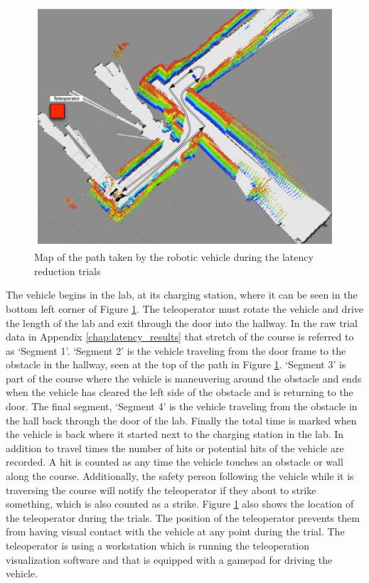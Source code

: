 \documentclass[12pt]{report}
\begin{document}
\begin{figure}[ht]
  \centering
  \includegraphics[width=6.5in,keepaspectratio]{latency_reduction_map.pdf}
  \caption{Map of the path taken by the robotic vehicle during the latency reduction trials}
  \label{fig:latency_reduction_map}
\end{figure}

The vehicle begins in the lab, at its charging station, where it can be seen in the bottom left corner of Figure \ref{fig:latency_reduction_map}.  The teleoperator must rotate the vehicle and drive the length of the lab and exit through the door into the hallway.  In the raw trial data in Appendix \ref{chap:latency_results} that stretch of the course is referred to as `Segment 1'.  `Segment 2' is the vehicle traveling from the door frame to the obstacle in the hallway, seen at the top of the path in Figure \ref{fig:latency_reduction_map}.  `Segment 3' is part of the course where the vehicle is maneuvering around the obstacle and ends when the vehicle has cleared the left side of the obstacle and is returning to the door.  The final segment, `Segment 4' is the vehicle traveling from the obstacle in the hall back through the door of the lab.  Finally the total time is marked when the vehicle is back where it started next to the charging station in the lab.  In addition to travel times the number of hits or potential hits of the vehicle are recorded.  A hit is counted as any time the vehicle touches an obstacle or wall along the course.  Additionally, the safety person following the vehicle while it is traversing the course will notify the teleoperator if they about to strike something, which is also counted as a strike.  Figure \ref{fig:latency_reduction_map} also shows the location of the teleoperator during the trials.  The position of the teleoperator prevents them from having visual contact with the vehicle at any point during the trial.  The teleoperator is using a workstation which is running the teleoperation visualization software and that is equipped with a gamepad for driving the vehicle.  
\end{document}
